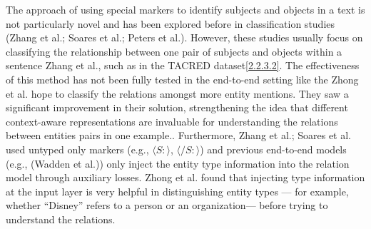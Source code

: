 The approach of using special markers to identify subjects and objects in a text is not particularly novel and has been explored before in classification studies (Zhang et al.\cite{zhang-etal-2019-ernie}; Soares et al.\cite{baldini-soares-etal-2019-matching}; Peters et al.\cite{peters2019knowledge}). However, these studies usually focus on classifying the relationship between one pair of subjects and objects within a sentence Zhang et al.\cite{zhang-etal-2017-position}, such as in the TACRED dataset\hyperref[sec:tacreddataset]{[2.2.3.2]}. The effectiveness of this method has not been fully tested in the end-to-end setting like the Zhong et al. \cite{Zhong2020AFE} hope to classify the relations amongst more entity mentions. They saw a significant improvement in their solution, strengthening the idea that different context-aware representations are invaluable for understanding the relations between entities pairs in one example.. Furthermore, Zhang et al.\cite{zhang-etal-2019-ernie}; Soares et al.\cite{baldini-soares-etal-2019-matching} used untyped only markers (e.g., \(\langle S:\rangle\), \(\langle /S:\rangle\)) and previous end-to-end models (e.g., (Wadden et al.\cite{Wadden2019EntityRA})) only inject the entity type information into the relation model through auxiliary losses. Zhong et al. \cite{Zhong2020AFE} found that injecting type information at the input layer is very helpful in distinguishing entity types — for example, whether “Disney” refers to a person or an organization— before trying to understand the relations.